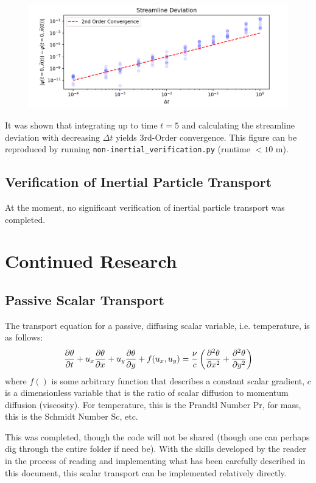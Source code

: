 \documentclass[12pt, reqno]{amsart}
\begin{document}
\begin{figure}[H]
    \centering
    \includegraphics[width = 1\linewidth]{predictor-corrector_verification.png}
\end{figure}

It was shown that integrating up to time $t = 5$ and calculating the streamline deviation with decreasing $\Delta t$ yields 3rd-Order convergence. This figure can be reproduced by running \texttt{non-inertial\_verification.py} (runtime $< 10$ m).

\subsection{Verification of Inertial Particle Transport}
At the moment, no significant verification of inertial particle transport was completed.

\section{Continued Research}

\subsection{Passive Scalar Transport}
The transport equation for a passive, diffusing scalar variable, i.e. temperature, is as follows:
\begin{equation}
    \pdv{\theta}{t} + u_x \pdv{\theta}{x} + u_y \pdv{\theta}{y} + f(u_x, u_y) = \frac{\nu}{c} \left( \pdv[2]{\theta}{x} + \pdv[2]{\theta}{y} \right)
\end{equation}
where $f()$ is some arbitrary function that describes a constant scalar gradient, $c$ is a dimensionless variable that is the ratio of scalar diffusion to momentum diffusion (viscosity). For temperature, this is the Prandtl Number $\mathrm{Pr}$, for mass, this is the Schmidt Number $\mathrm{Sc}$, etc.

This was completed, though the code will not be shared (though one can perhaps dig through the entire folder if need be). With the skills developed by the reader in the process of reading and implementing what has been carefully described in this document, this scalar transport can be implemented relatively directly. 
\end{document}
